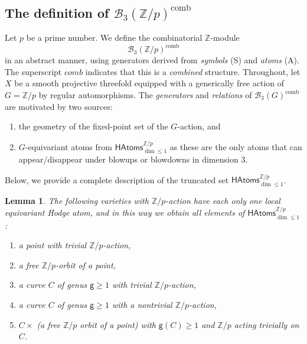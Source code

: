 \documentclass[12pt,a4paper]{amsart}
\newtheorem{lemma}[theorem]{Lemma}
\theoremstyle{definition}
\theoremstyle{remark}
\newcommand{\Z}{\mathbb{Z}}
\begin{document}

\


\subsection{The definition of $\mathcal{B}_3(\mathbb Z/p)^{\mathrm{comb}}$}
\label{sec:B_3-comb}
Let $p$ be a prime number. We define the combinatorial $\Z$-module 
\[
\mathcal{B}_3(\Z/p)^{\mathrm{comb}}
\]
in an abstract manner, using generators derived from \emph{symbols} (S) and \emph{atoms} (A). The superscript $comb$ indicates that this is a \emph{combined} structure. Throughout, let $X$ be a smooth projective threefold equipped with a generically free action of $G = \Z/p$ by regular automorphisms. The \emph{generators} and \emph{relations} of $\mathcal{B}_3(G)^{\mathrm{comb}}$ are motivated by two sources:
\begin{enumerate}
    \item the geometry of the fixed-point set of the $G$-action, and
    \item $G$-equivariant atoms from \( \mathsf{HAtoms}^{\Z/p}_{\dim \leq 1} \) as these are the only atoms that can appear/disappear under blowups or blowdowns in dimension $3$.
\end{enumerate}

\medskip

Below, we provide a complete description of the truncated set 
\(\mathsf{HAtoms}^{\Z/p}_{\dim \leq 1}\).

\begin{lemma}\label{lem:atom-generators-2}
The following varieties with $\Z/p$-action have each only one local equivariant Hodge atom, and in this way we obtain \textit{all} elements of \(\mathsf{HAtoms}^{\Z/p}_{\dim \leq 1}\):
\begin{enumerate}
    \item a point with trivial $\Z/p$-action,
    \item  a free $\Z/p$-orbit of a point,
    \item  a curve $C$ of genus $\mathsf{g} \geq 1$ with trivial $\Z/p$-action,
    \item a curve $C$ of genus $\mathsf{g} \geq 1$ with a nontrivial $\Z/p$-action,
    \item $C\times$ (a free $\mathbb Z/p$ orbit of a point) with $\mathsf{g}(C)\geq 1$ and $\mathbb Z/p$ acting
trivially on $C$.
\end{enumerate}
\end{lemma}
\end{document}
